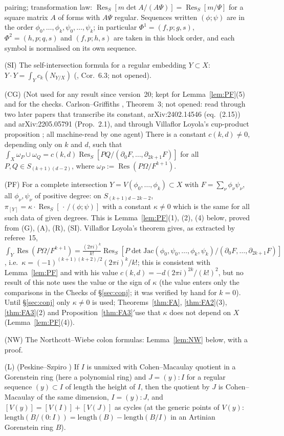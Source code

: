 \documentclass[11pt]{article}
\numberwithin{equation}{section}
\newcommand{\allr}{\ref{thm:FA3}$'$}
\theoremstyle{remark}
\newcommand{\Res}{\operatorname{Res}}
\begin{document}
\begin{itemize}
pairing; transformation law: $\Res_S[m\det A/(A\Psi)]=\Res_S[m/\Psi]$ for a square matrix $A$ of forms with
$A\Psi$ regular. Sequences written $(\phi;\psi)$ are in the order $\phi_0,\dots,\phi_k,\psi_0,\dots,\psi_k$; in
particular $\Phi^1=(f,p;g,s)$, $\Phi^2=(h,p;q,s)$ and $(f,p;h,s)$ are taken in this block order, and each symbol is
normalised on its own sequence.
\item[(SI)] The self-intersection formula for a regular embedding $Y\subset X$: $Y\cdot Y=\int_Yc_k(N_{Y/X})$
(\cite{Fu}, Cor.~6.3; not opened).
\item[(CG)] (Not used for any result since version~20; kept for Lemma~\ref{lem:PF}(5) and for the checks.
Carlson--Griffiths \cite{CG}, Theorem~3; not opened: read through two later papers that transcribe
its constant, arXiv:2402.14546 (eq.~(2.15)) and arXiv:2205.05791 (Prop.~2.1), and through Villaflor Loyola's
cup-product proposition \cite[\S6]{VL}; all machine-read by one agent) There is a constant
$c(k,d)\ne0$, depending only on $k$ and $d$, such that
$\int_X\omega_P\cup\omega_Q=c(k,d)\Res_S[PQ/(\partial_0F,\dots,\partial_{2k+1}F)]$ for all
$P,Q\in S_{(k+1)(d-2)}$, where $\omega_P:=\Res(P\Omega/F^{k+1})$.
\item[(PF)] For a complete intersection $Y=V(\phi_0,\dots,\phi_k)\subset X$ with $F=\sum_\nu\phi_\nu\psi_\nu$, all
$\phi_\nu,\psi_\nu$ of positive degree: on $S_{(k+1)d-2k-2}$,
$\pi_{[Y]}=\kappa\cdot\Res_S[\,\cdot\,/(\phi;\psi)]$ with a constant $\kappa\ne0$ which is the same for all such
data of given degrees. This is Lemma~\ref{lem:PF}(1), (2), (4) below, proved from (G), (A), (R), (SI).
Villaflor Loyola's theorem \cite[Theorem~1.2]{VL} gives, as extracted by referee~15,
$\int_Y\Res(P\Omega/F^{k+1})=\frac{(2\pi i)^k}{k!}\Res_S[P\det\mathrm{Jac}(\phi_0,\psi_0,\dots,\phi_k,\psi_k)/(\partial_0F,\dots,\partial_{2k+1}F)]$,
i.e.\ $\kappa=(-1)^{(k+1)(k+2)/2}(2\pi i)^k/k!$; this is consistent with Lemma~\ref{lem:PF} and with his value
$c(k,d)=-d(2\pi i)^{2k}/(k!)^2$, but no result of this note uses the value or the sign of $\kappa$ (the value
enters only the comparisons in the Checks of \S\ref{sec:conj}; it was verified by hand for $k=0$).
Until \S\ref{sec:conj} only $\kappa\ne0$ is used; Theorems~\ref{thm:FA}, \ref{thm:FA2}(3), \ref{thm:FA3}(2) and
Proposition~\allr use that $\kappa$ does not depend on $X$ (Lemma~\ref{lem:PF}(4)).
\item[(NW)] The Northcott--Wiebe colon formulas: Lemma~\ref{lem:NW} below, with a proof.
\item[(L)] (Peskine--Szpiro \cite{PS}) If $I$ is unmixed with Cohen--Macaulay quotient in a Gorenstein ring
(here a polynomial ring) and $J=(y):I$ for a regular sequence $(y)\subset I$ of length the height of $I$, then
the quotient by $J$ is Cohen--Macaulay of the same dimension, $I=(y):J$, and $[V(y)]=[V(I)]+[V(J)]$ as cycles (at
the generic points of $V(y)$: $\mathrm{length}(B/(0:I))=\mathrm{length}(B)-\mathrm{length}(B/I)$ in an Artinian
Gorenstein ring $B$).
\end{itemize}
\end{document}
